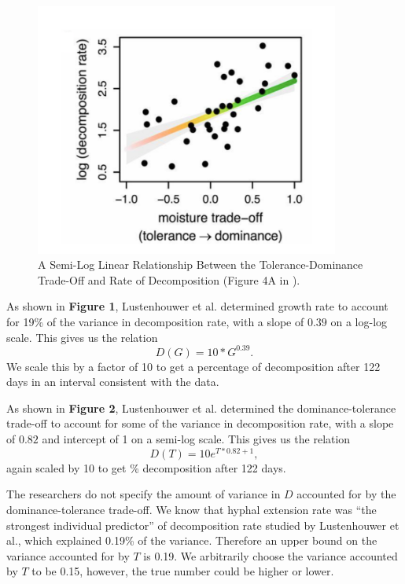 \documentclass[12pt]{article}
\begin{document}
\begin{figure}[h!]
\begin{center}
\includegraphics[width=10cm]{TtoD.png}
\caption{A Semi-Log Linear Relationship Between the Tolerance-Dominance Trade-Off and Rate of Decomposition (Figure 4A in \cite{lustenhouwer}).}
\end{center}
\end{figure}

As shown in \textbf{Figure 1}, Lustenhouwer et al. determined growth rate to account for 19\% of the variance in decomposition rate, with a slope of $0.39$ on a log-log scale.
This gives us the relation 
\[
D(G) = 10*G^{0.39}.
\]
We scale this by a factor of 10 to get a percentage of decomposition after 122 days in an interval consistent with the data. 




As shown in \textbf{Figure 2}, Lustenhouwer et al. determined the dominance-tolerance trade-off to account for some of the variance in decomposition rate, with a slope of $0.82$ and intercept of 1 on a semi-log scale. This gives us the relation
\[
D(T) = 10 e^{T*0.82+1},
\]
again scaled by 10 to get \% decomposition after 122 days. 



The researchers do not specify the amount of variance in $D$ accounted for by the dominance-tolerance trade-off. We know that hyphal extension rate was ``the strongest individual predictor'' \cite{lustenhouwer}  of decomposition rate studied by Lustenhouwer et al., which explained 0.19\% of the variance. Therefore an upper bound on the variance accounted for by $T$ is 0.19. We arbitrarily choose the variance accounted by $T$ to be 0.15, however, the true number could be higher or lower. 
\end{document}
